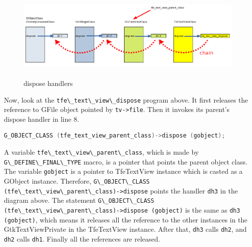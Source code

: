 \begin{figure}
\centering
\includegraphics[width=14.925cm,height=4.455cm]{../image/dispose_handler.png}
\caption{dispose handlers}
\end{figure}

Now, look at the \passthrough{\lstinline!tfe\_text\_view\_dispose!}
program above. It first releases the reference to GFile object pointed
by \passthrough{\lstinline!tv->file!}. Then it invokes its parent's
dispose handler in line 8.

\begin{lstlisting}[language=C]
G_OBJECT_CLASS (tfe_text_view_parent_class)->dispose (gobject);
\end{lstlisting}

A variable \passthrough{\lstinline!tfe\_text\_view\_parent\_class!},
which is made by \passthrough{\lstinline!G\_DEFINE\_FINAL\_TYPE!} macro,
is a pointer that points the parent object class. The variable
\passthrough{\lstinline!gobject!} is a pointer to TfeTextView instance
which is casted as a GObject instance. Therefore,
\passthrough{\lstinline!G\_OBJECT\_CLASS (tfe\_text\_view\_parent\_class)->dispose!}
points the handler \passthrough{\lstinline!dh3!} in the diagram above.
The statement
\passthrough{\lstinline!G\_OBJECT\_CLASS (tfe\_text\_view\_parent\_class)->dispose (gobject)!}
is the same as \passthrough{\lstinline!dh3 (gobject)!}, which means it
releases all the reference to the other instances in the
GtkTextViewPrivate in the TfeTextView instance. After that,
\passthrough{\lstinline!dh3!} calls \passthrough{\lstinline!dh2!}, and
\passthrough{\lstinline!dh2!} calls \passthrough{\lstinline!dh1!}.
Finally all the references are released.
